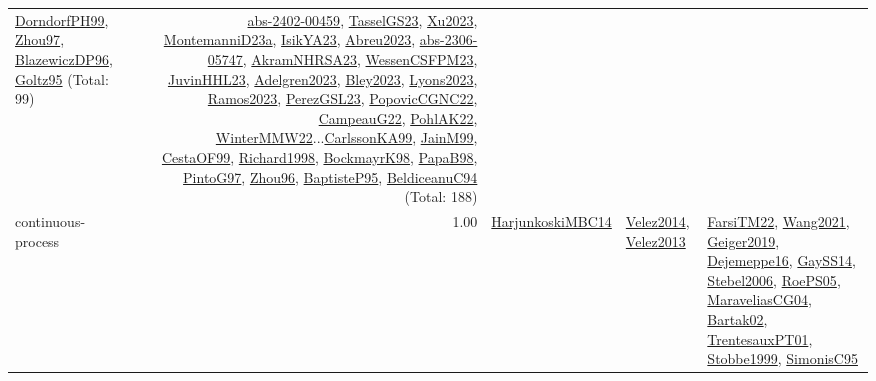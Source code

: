 {\begin{longtable}{p{3cm}r>{\raggedright\arraybackslash}p{6cm}>{\raggedright\arraybackslash}p{6cm}>{\raggedright\arraybackslash}p{8cm}}
\hyperref[detail:DorndorfPH99]{DorndorfPH99}, \hyperref[detail:Zhou97]{Zhou97}, \hyperref[detail:BlazewiczDP96]{BlazewiczDP96}, \hyperref[detail:Goltz95]{Goltz95} (Total: 99) & \hyperref[detail:abs-2402-00459]{abs-2402-00459}, \hyperref[detail:TasselGS23]{TasselGS23}, \hyperref[detail:Xu2023]{Xu2023}, \hyperref[detail:MontemanniD23a]{MontemanniD23a}, \hyperref[detail:IsikYA23]{IsikYA23}, \hyperref[detail:Abreu2023]{Abreu2023}, \hyperref[detail:abs-2306-05747]{abs-2306-05747}, \hyperref[detail:AkramNHRSA23]{AkramNHRSA23}, \hyperref[detail:WessenCSFPM23]{WessenCSFPM23}, \hyperref[detail:JuvinHHL23]{JuvinHHL23}, \hyperref[detail:Adelgren2023]{Adelgren2023}, \hyperref[detail:Bley2023]{Bley2023}, \hyperref[detail:Lyons2023]{Lyons2023}, \hyperref[detail:Ramos2023]{Ramos2023}, \hyperref[detail:PerezGSL23]{PerezGSL23}, \hyperref[detail:PopovicCGNC22]{PopovicCGNC22}, \hyperref[detail:CampeauG22]{CampeauG22}, \hyperref[detail:PohlAK22]{PohlAK22}, \hyperref[detail:WinterMMW22]{WinterMMW22}...\hyperref[detail:CarlssonKA99]{CarlssonKA99}, \hyperref[detail:JainM99]{JainM99}, \hyperref[detail:CestaOF99]{CestaOF99}, \hyperref[detail:Richard1998]{Richard1998}, \hyperref[detail:BockmayrK98]{BockmayrK98}, \hyperref[detail:PapaB98]{PapaB98}, \hyperref[detail:PintoG97]{PintoG97}, \hyperref[detail:Zhou96]{Zhou96}, \hyperref[detail:BaptisteP95]{BaptisteP95}, \hyperref[detail:BeldiceanuC94]{BeldiceanuC94} (Total: 188)\\
\index{continuous-process}\index{Concepts!continuous-process}continuous-process &  1.00 & \hyperref[detail:HarjunkoskiMBC14]{HarjunkoskiMBC14} & \hyperref[detail:Velez2014]{Velez2014}, \hyperref[detail:Velez2013]{Velez2013} & \hyperref[detail:FarsiTM22]{FarsiTM22}, \hyperref[detail:Wang2021]{Wang2021}, \hyperref[detail:Geiger2019]{Geiger2019}, \hyperref[detail:Dejemeppe16]{Dejemeppe16}, \hyperref[detail:GaySS14]{GaySS14}, \hyperref[detail:Stebel2006]{Stebel2006}, \hyperref[detail:RoePS05]{RoePS05}, \hyperref[detail:MaraveliasCG04]{MaraveliasCG04}, \hyperref[detail:Bartak02]{Bartak02}, \hyperref[detail:TrentesauxPT01]{TrentesauxPT01}, \hyperref[detail:Stobbe1999]{Stobbe1999}, \hyperref[detail:SimonisC95]{SimonisC95}\\

\end{longtable}}
